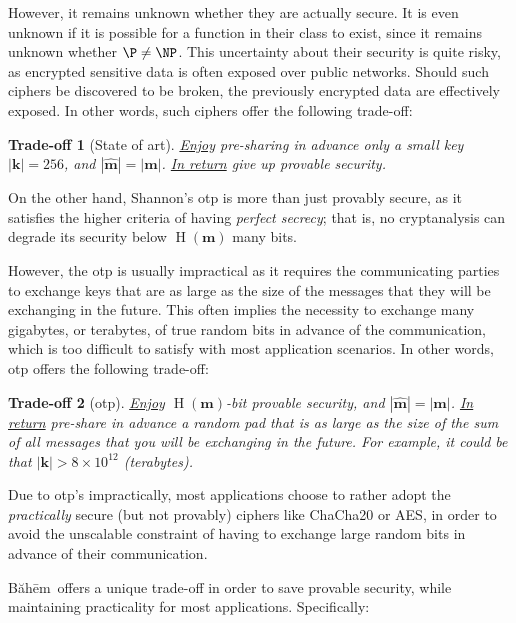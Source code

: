\documentclass[twocolumn,hidelinks]{article}
\newcommand{\baheem}{Băhēm}
\DeclareMathOperator{\entropy}{H}
\newtheorem{tradeoff}{Trade-off}
\begin{document}
However, it remains unknown whether they are actually secure.  It is even
unknown if it is possible for a function in their class to exist, since it
remains unknown whether $\P \ne \NP$. This uncertainty about their security
is quite risky, as encrypted sensitive data is often exposed over public
networks.  Should such ciphers be discovered to be broken, the previously
encrypted data are effectively exposed.  In other words, such ciphers offer
the following trade-off:

\begin{tradeoff}[State of art]
    \emph{\underline{Enjoy}} pre-sharing in advance only a small key
    $|\mathbf{k}|=256$, and $|\mathbf{\hat m}| = |\mathbf{m}|$.
    \emph{\underline{In return}} give up provable security.
    \label{tradeoff_otp}
\end{tradeoff}

On the other hand, Shannon's \gls{otp} is more than just provably secure,
as it satisfies the higher criteria of having \emph{perfect secrecy}; that
is, no cryptanalysis can degrade its security below $\entropy(\mathbf{m})$
many bits.

However, the \gls{otp} is usually impractical as it requires the
communicating parties to exchange keys that are as large as the size of the
messages that they will be exchanging in the future.  This often implies
the necessity to exchange many gigabytes, or terabytes, of true random bits
in advance of the communication, which is too difficult to satisfy with
most application scenarios.  In other words, \gls{otp} offers the following
trade-off:

\begin{tradeoff}[\gls{otp}]
    \emph{\underline{Enjoy}} $\entropy(\mathbf{m})$-bit provable security,
    and $|\mathbf{\hat m}| = |\mathbf{m}|$.
    \emph{\underline{In return}} pre-share in advance a random pad that is
    as large as the size of the sum of all messages that you will be
    exchanging in the future.  For example, it could be that $|\mathbf{k}|
    > 8 \times 10^{12}$ (terabytes).
    \label{tradeoff_otp}
\end{tradeoff}

Due to \gls{otp}'s impractically, most applications choose to rather adopt
the \emph{practically} secure (but not provably) ciphers like ChaCha20 or
AES, in order to avoid the unscalable constraint of having to exchange
large random bits in advance of their communication.

\baheem\ offers a unique trade-off in order to save provable security,
while maintaining practicality for most applications. Specifically:
\end{document}
